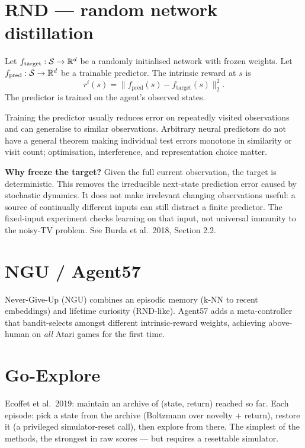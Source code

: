 \documentclass[11pt,oneside]{scrbook}
\begin{document}
\section{RND --- random network distillation}

\begin{definition}[RND]
Let $f_{\mathrm{target}}: \mathcal{S} \to \mathbb{R}^d$ be a randomly initialised network with frozen weights.
Let $f_{\mathrm{pred}}: \mathcal{S} \to \mathbb{R}^d$ be a trainable predictor. The intrinsic reward at $s$ is
\[
  r^i(s) = \|f_{\mathrm{pred}}(s) - f_{\mathrm{target}}(s)\|_2^2.
\]
The predictor is trained on the agent's observed states.
\end{definition}

\begin{remark}
Training the predictor usually reduces error on repeatedly visited observations
and can generalise to similar observations. Arbitrary neural predictors do not
have a general theorem making individual test errors monotone in similarity or
visit count; optimisation, interference, and representation choice matter.
\end{remark}

\textbf{Why freeze the target?} Given the full current observation, the target
is deterministic. This removes the irreducible next-state prediction error caused
by stochastic dynamics. It does not make irrelevant changing observations useful:
a source of continually different inputs can still distract a finite predictor.
The fixed-input experiment checks learning on that input, not universal immunity
to the noisy-TV problem. See Burda et al.\ 2018, Section 2.2.

\section{NGU / Agent57}

Never-Give-Up (NGU) combines an episodic memory (k-NN to recent embeddings) and lifetime curiosity (RND-like). Agent57 adds a meta-controller that bandit-selects amongst different intrinsic-reward weights, achieving above-human on \emph{all} Atari games for the first time.

\section{Go-Explore}

Ecoffet et al.\ 2019: maintain an archive of (state, return) reached so far. Each episode: pick a state from the archive (Boltzmann over novelty + return), restore it (a privileged simulator-reset call), then explore from there. The simplest of the methods, the strongest in raw scores --- but requires a resettable simulator.
\end{document}
